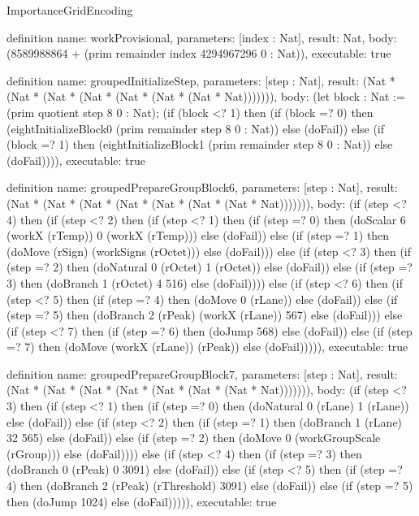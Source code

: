 \begin{lexlean}{ImportanceGridEncoding}
\begin{semanticmodule}
definition{
  name: workProvisional,
  parameters: [index : Nat],
  result: Nat,
  body: (8589988864 + (prim remainder index 4294967296 0 : Nat)),
  executable: true
}

definition{
  name: groupedInitializeStep,
  parameters: [step : Nat],
  result: (Nat * (Nat * (Nat * (Nat * (Nat * (Nat * (Nat * Nat))))))),
  body: (let block : Nat := (prim quotient step 8 0 : Nat); (if (block <? 1) then
      (if (block =? 0) then (eightInitializeBlock0 (prim remainder step 8 0 : Nat)) else (doFail)) else
      (if (block =? 1) then (eightInitializeBlock1 (prim remainder step 8 0 : Nat)) else (doFail)))),
  executable: true
}

definition{
  name: groupedPrepareGroupBlock6,
  parameters: [step : Nat],
  result: (Nat * (Nat * (Nat * (Nat * (Nat * (Nat * (Nat * Nat))))))),
  body: (if (step <? 4) then
      (if (step <? 2) then
      (if (step <? 1) then
      (if (step =? 0) then (doScalar 6 (workX (rTemp)) 0 (workX (rTemp))) else (doFail)) else
      (if (step =? 1) then (doMove (rSign) (workSigns (rOctet))) else (doFail))) else
      (if (step <? 3) then
      (if (step =? 2) then (doNatural 0 (rOctet) 1 (rOctet)) else (doFail)) else
      (if (step =? 3) then (doBranch 1 (rOctet) 4 516) else (doFail)))) else
      (if (step <? 6) then
      (if (step <? 5) then
      (if (step =? 4) then (doMove 0 (rLane)) else (doFail)) else
      (if (step =? 5) then (doBranch 2 (rPeak) (workX (rLane)) 567) else (doFail))) else
      (if (step <? 7) then
      (if (step =? 6) then (doJump 568) else (doFail)) else
      (if (step =? 7) then (doMove (workX (rLane)) (rPeak)) else (doFail))))),
  executable: true
}

definition{
  name: groupedPrepareGroupBlock7,
  parameters: [step : Nat],
  result: (Nat * (Nat * (Nat * (Nat * (Nat * (Nat * (Nat * Nat))))))),
  body: (if (step <? 3) then
      (if (step <? 1) then
      (if (step =? 0) then (doNatural 0 (rLane) 1 (rLane)) else (doFail)) else
      (if (step <? 2) then
      (if (step =? 1) then (doBranch 1 (rLane) 32 565) else (doFail)) else
      (if (step =? 2) then (doMove 0 (workGroupScale (rGroup))) else (doFail)))) else
      (if (step <? 4) then
      (if (step =? 3) then (doBranch 0 (rPeak) 0 3091) else (doFail)) else
      (if (step <? 5) then
      (if (step =? 4) then (doBranch 2 (rPeak) (rThreshold) 3091) else (doFail)) else
      (if (step =? 5) then (doJump 1024) else (doFail))))),
  executable: true
}


\end{semanticmodule}
\end{lexlean}
